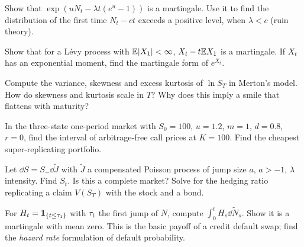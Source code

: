 \begin{exercises}
\item Show that $\exp(uN_t-\lambda t(e^u-1))$ is a martingale. Use it to find the distribution of the first time $N_t-ct$ exceeds a positive level, when $\lambda<c$ (ruin theory).
\item Show that for a L\'evy process with $\mathbb{E}|X_1|<\infty$, $X_t-t\mathbb{E} X_1$ is a martingale. If $X_t$ has an exponential moment, find the martingale form of $e^{X_t}$.
\item Compute the variance, skewness and excess kurtosis of $\ln S_T$ in Merton's model. How do skewness and kurtosis scale in $T$? Why does this imply a smile that flattens with maturity?
\item In the three-state one-period market with $S_0=100$, $u=1.2$, $m=1$, $d=0.8$, $r=0$, find the interval of arbitrage-free call prices at $K=100$. Find the cheapest super-replicating portfolio.
\item Let $\dd S=S_{-}\dd\tilde J$ with $\tilde J$ a compensated Poisson process of jump size $a$, $a>-1$, $\lambda$ intensity. Find $S_t$. Is this a complete market? Solve for the hedging ratio replicating a claim $V(S_T)$ with the stock and a bond.
\item For $H_t=\mathbf{1}_{\{t\le\tau_1\}}$ with $\tau_1$ the first jump of $N$, compute $\int_0^tH_s\dd\tilde N_s$. Show it is a martingale with mean zero. This is the basic payoff of a credit default swap; find the \emph{hazard rate} formulation of default probability.
\end{exercises}
